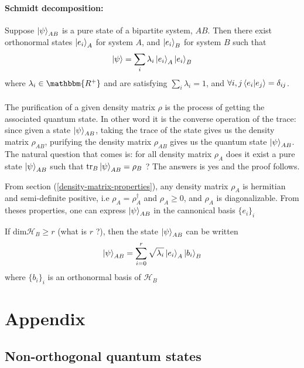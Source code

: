 \documentclass{article}
\begin{document}
\paragraph{Schmidt decomposition: }
Suppose $\ket{\psi}_{AB}$ is a pure state of a bipartite system, $AB$. Then
there exist orthonormal states $\ket{e_i}_A$ for system $A$, and $\ket{e_i}_B$
for system $B$ such that
\begin{equation}
    \ket{\psi} = \sum_i\lambda_i \ket{e_i}_A \ket{e_i}_B
\end{equation}
where $\lambda_i \in \mathbbm{R^+}$ and are satisfying $\sum_i\lambda_i=1$, and
$\forall i,j \braket{e_i|e_j}=\delta_{ij}$.
\\ \\
The purification of a given density matrix $\rho$ is the process of getting the
associated quantum state. In other word it is the converse operation of the
trace: since given a state $\ket{\psi}_{AB}$, taking the trace of the state
gives us the density matrix $\rho_{AB}$, purifying the density matrix
$\rho_{AB}$ gives us the quantum state $\ket{\psi}_{AB}$.\\
The natural question that comes is: for all density matrix $\rho_A$ does it
exist a pure state $\ket{\psi}_{AB}$ such that $\text{tr}_B\ket{\psi}_{AB} =
\rho_B$ ? The answers is yes and the proof follows.

From section (\ref{density-matrix-properties}), any density matrix $\rho_A$ is
hermitian and semi-definite positive, i.e $\rho_A=\rho^\dagger_A$ and $\rho_A
\geq 0$, and $\rho_A$ is diagonalizable. From theses properties, one can express
$\ket{\psi}_{AB}$ in the cannonical basis $\{e_i\}_i$

If dim$\mathscr{H}_B \geq r$ (what is $r$ ?), then the state $\ket{\psi}_{AB}$
can be written
\begin{equation}
    \ket{\psi}_{AB} = \sum_{i=0}^r \sqrt{\lambda_i} \ket{e_i}_A\ket{b_i}_B
\end{equation}
where $\{b_i\}_i$ is an orthonormal basis of $\mathscr{H}_B$
\newpage
\section{Appendix}
\subsection{Non-orthogonal quantum states}
\end{document}
